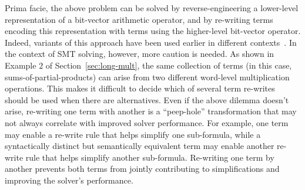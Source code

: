 Prima facie, the above problem can be solved by reverse-engineering a
lower-level representation of a bit-vector arithmetic operator, and by
re-writing terms encoding this representation with terms using the
higher-level bit-vector operator.  Indeed, variants of this approach
have been used earlier in different
contexts~\cite{kunz,ciesielski,kolbl,reveng,earlier-pat-match-synopsys}.
In the context of SMT solving, however, more caution is needed.
As shown in Example $2$ of Section~\ref{sec:long-mult}, the same
collection of terms (in this case, sums-of-partial-products) can arise
from two different word-level multiplication operations.  This makes it
difficult to decide which of several term re-writes should be
used when there are alternatives. %
Even if the above dilemma doesn't arise, re-writing one term with
another is a ``peep-hole'' transformation that may not always
correlate with improved solver performance. %
For example, one term may enable a re-write rule that helps simplify
one sub-formula, while a syntactically distinct but semantically
equivalent term may enable another re-write rule that helps simplify
another sub-formula. Re-writing one term by another prevents
both terms from jointly contributing to simplifications and improving
the solver's performance.%

